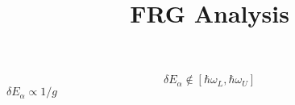 \documentclass{article}
\title{FRG Analysis}
\begin{document}
\begin{equation*}
    \delta E_\alpha \not\in [\hbar \omega_L , \hbar \omega_U]
\end{equation*}
$\delta E_\alpha \propto 1/g $
\end{document}
